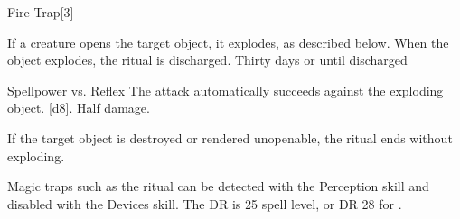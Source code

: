 \begin{spellsection}{Fire Trap}[3]
    \begin{spellheader}
    \end{spellheader}
    \begin{spellcontent}
        \begin{spelltargetinginfo}
            \spellrng{\rngtouch}
        \end{spelltargetinginfo}
        \begin{spelleffects}
            \spelleffect If a creature opens the target object, it explodes, as described below. When the object explodes, the ritual is discharged.
            \spelldur Thirty days or until discharged \dismissable
        \end{spelleffects}
    \end{spellcontent}
    \begin{spellsubcontent}
        \begin{spelltargetinginfo}
        \end{spelltargetinginfo}
        \begin{spelleffects}
            \begin{spellattack}{Spellpower vs. Reflex}
                \spellspecial The attack automatically succeeds against the exploding object.
                \spellsuccess {}[d8].
                \spellfailure Half damage.
            \end{spellattack}
        \end{spelleffects}
    \end{spellsubcontent}
    \begin{spellfooter}
        \spellnotes If the target object is destroyed or rendered unopenable, the ritual ends without exploding.

        \par Magic traps such as the  ritual can be detected with the Perception skill and disabled with the Devices skill. The DR is 25 \add spell level, or DR 28 for .
    \end{spellfooter}
    \begin{spellaugments}
    \end{spellaugments}
\end{spellsection}

